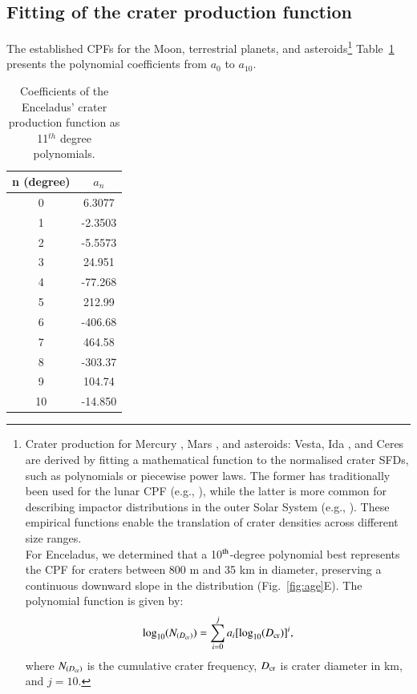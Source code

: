 \documentclass[preprint,12pt,3p,times,authoryear]{elsarticle}
\begin{document}
\subsection{Fitting of the crater production function}
\label{subsec:fitting}
The established CPFs for the Moon, terrestrial planets, and asteroids\footnote{Crater production for Mercury \citep{Neukum2001}, Mars \citep{Ivanov2001, Hartmann2005}, and asteroids: Vesta, Ida \citep{Schmedemann2014}, and Ceres \citep{Hiesinger2016} are derived by fitting a mathematical function to the normalised crater SFDs, such as polynomials or piecewise power laws. The former has traditionally been used for the lunar CPF (e.g., \citealt{Neukum2001}), while the latter is more common for describing impactor distributions in the outer Solar System (e.g., \citealt{Zahnle2003}). These empirical functions enable the translation of crater densities across different size ranges. \\

For Enceladus, we determined that a 10$^{\rm th}$-degree polynomial best represents the CPF for craters between 800 m and 35 km in diameter, preserving a continuous downward slope in the distribution (Fig.~\ref{fig:age}E). The polynomial function is given by:
\begin{equation}
    \log_{10}(N_{(D_{\rm cr})}) = \sum_{i=0}^{j} a_{i} [\log_{10}(D_{\rm cr})]^i,
    \label{equ:cpf}
\end{equation}
where $N_{(D_{\rm cr})}$ is the cumulative crater frequency, $D_{\rm cr}$ is crater diameter in km, and $j = 10$.
}
Table~\ref{tab:cpf} presents the polynomial coefficients from $a_{0}$ to $a_{10}$.\\
%
\begin{table}[t]%
\centering
\begin{tabular}{cc}
\hline
\textbf{n (degree)} & \textbf{$a_n$} \\
\hline
0  & 6.3077   \\
1  & -2.3503  \\
2  & -5.5573  \\
3  & 24.951   \\
4  & -77.268  \\
5  & 212.99   \\
6  & -406.68  \\
7  & 464.58   \\
8  & -303.37  \\
9  & 104.74   \\
10 & -14.850  \\
\hline
\end{tabular}
\caption{Coefficients of the Enceladus’ crater production function as 11$^{th}$ degree polynomials.}
\label{tab:cpf}
\end{table}
\end{document}
